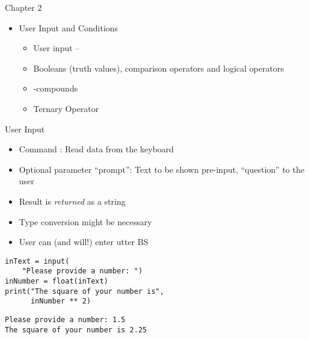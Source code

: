 
\begin{frame}{Chapter 2}
%
\begin{itemize}
\item  User Input and Conditions
	\begin{itemize}
	\item User input -- 
	\item Booleans (truth values), comparison operators and logical operators
	\item {}-compounds
	\item Ternary Operator
	\end{itemize}
\end{itemize}
%
\end{frame}


\begin{frame}[fragile]{User Input}
%
\begin{itemize}
\item Command : Read data from the keyboard
\item Optional parameter \enquote{prompt}: Text to be shown pre-input, \zB \enquote{question} to the user
\item Result is \emph{returned} as a string
\item[\Thus] Type conversion might be necessary
\item User can (and will!) enter utter BS
\end{itemize}
%
\begin{codebox}[Code: \texttt{input}, width=.49\linewidth, nobeforeafter, equal height group = grpInput]
\begin{verbatim}
inText = input(
    "Please provide a number: ")
inNumber = float(inText)
print("The square of your number is",
      inNumber ** 2)
\end{verbatim}
\end{codebox}
%
\begin{cmdbox}[Output: \texttt{input}, width=.49\linewidth, nobeforeafter, equal height group = grpInput]
\begin{verbatim}
Please provide a number: 1.5
The square of your number is 2.25
\end{verbatim}
\end{cmdbox}
%
\end{frame}

